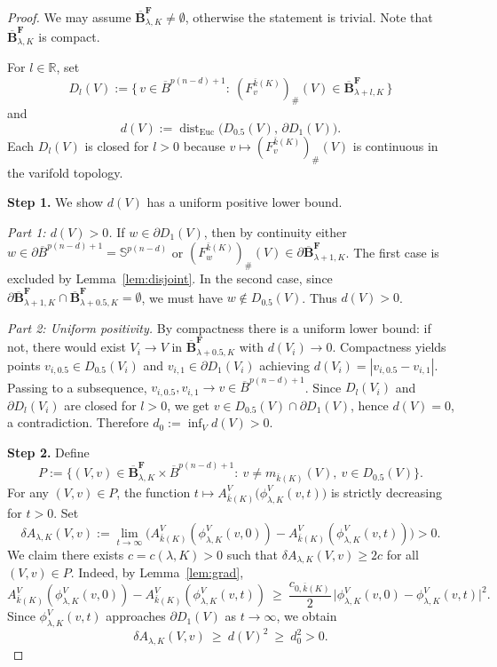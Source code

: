\documentclass[12pt,english]{article}
\theoremstyle{definition}
\begin{document}
\begin{proof}
We may assume \(\overline{\mathbf{B}}^{\mathbf F}_{\lambda,K}\neq\emptyset\), otherwise the statement is trivial. Note that \(\overline{\mathbf{B}}^{\mathbf F}_{\lambda,K}\) is compact.

For \(l\in\mathbb R\), set
\[
D_l(V):=\bigl\{\,v\in\overline{B}^{p(n-d)+1}:\ (F_v^{\bar{k}(K)})_\#(V)\in \overline{\mathbf{B}}^{\mathbf F}_{\lambda+l,K}\,\bigr\}
\]
and
\[
d(V):=\operatorname{dist}_{\mathrm{Euc}}\bigl(D_{0.5}(V),\,\partial D_1(V)\bigr).
\]
Each \(D_l(V)\) is closed for \(l>0\) because \(v\mapsto (F_v^{\bar{k}(K)})_\#(V)\) is continuous in the varifold topology.

\textbf{Step 1.} We show \(d(V)\) has a uniform positive lower bound.

\emph{Part 1: \(d(V)>0\).}  
If \(w\in\partial D_1(V)\), then by continuity either \(w\in\partial\overline{B}^{p(n-d)+1}=\mathbb S^{p(n-d)}\) or \((F_w^{\bar{k}(K)})_\#(V)\in \partial\overline{\mathbf{B}}^{\mathbf F}_{\lambda+1,K}\). The first case is excluded by Lemma~\ref{lem:disjoint}. In the second case, since \(\partial\overline{\mathbf{B}}^{\mathbf F}_{\lambda+1,K}\cap \overline{\mathbf{B}}^{\mathbf F}_{\lambda+0.5,K}=\emptyset\), we must have \(w\notin D_{0.5}(V)\). Thus \(d(V)>0\).

\emph{Part 2: Uniform positivity.}  
By compactness there is a uniform lower bound: if not, there would exist \(V_i\to V\) in \(\overline{\mathbf{B}}^{\mathbf F}_{\lambda+0.5,K}\) with \(d(V_i)\to0\). Compactness yields points \(v_{i,0.5}\in D_{0.5}(V_i)\) and \(v_{i,1}\in\partial D_1(V_i)\) achieving \(d(V_i)=|v_{i,0.5}-v_{i,1}|\). Passing to a subsequence, \(v_{i,0.5},v_{i,1}\to v\in\overline{B}^{p(n-d)+1}\). Since \(D_l(V_i)\) and \(\partial D_l(V_i)\) are closed for \(l>0\), we get \(v\in D_{0.5}(V)\cap\partial D_1(V)\), hence \(d(V)=0\), a contradiction. Therefore \(d_0:=\inf_{V}d(V)>0\).

\textbf{Step 2.} Define
\[
P:=\bigl\{(V,v)\in \overline{\mathbf{B}}^{\mathbf F}_{\lambda,K}\times \overline{B}^{p(n-d)+1}:\ v\neq m_{\bar{k}(K)}(V),\ v\in D_{0.5}(V)\bigr\}.
\]
For any \((V,v)\in P\), the function \(t\mapsto A^V_{\bar{k}(K)}\bigl(\phi^V_{\lambda,K}(v,t)\bigr)\) is strictly decreasing for \(t>0\). Set
\[
\delta A_{\lambda,K}(V,v)
:=\lim_{t\to\infty}\bigl(A^V_{\bar{k}(K)}(\phi^V_{\lambda,K}(v,0))-
A^V_{\bar{k}(K)}(\phi^V_{\lambda,K}(v,t))\bigr)>0.
\]
We claim there exists \(c=c(\lambda,K)>0\) such that \(\delta A_{\lambda,K}(V,v)\ge 2c\) for all \((V,v)\in P\). Indeed, by Lemma~\ref{lem:grad},
\[
A^V_{\bar{k}(K)}(\phi^V_{\lambda,K}(v,0))-
A^V_{\bar{k}(K)}(\phi^V_{\lambda,K}(v,t))
\ \ge\ \frac{c_{0,\bar{k}(K)}}{2}\,\bigl|\phi^V_{\lambda,K}(v,0)-\phi^V_{\lambda,K}(v,t)\bigr|^2.
\]
Since \(\phi^V_{\lambda,K}(v,t)\) approaches \(\partial D_{\mathrm{1}}(V)\) as \(t\to\infty\), we obtain
\[
\delta A_{\lambda,K}(V,v)\ \ge\ d(V)^2\ \ge\ d_0^2>0.
\]


\end{proof}
\end{document}

